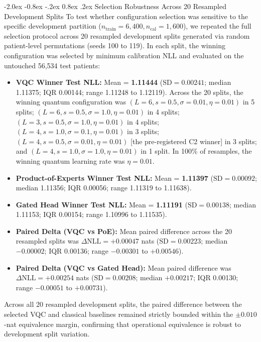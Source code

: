 \documentclass[10pt,a4paper]{article}
\makeatletter
\renewcommand{\subsection}{\@startsection{subsection}{2}{\z@}%
  {-2.0ex \@plus -0.8ex \@minus -.2ex}%
  {0.8ex \@plus.2ex}%
  {\normalfont\large\sffamily\bfseries\color{naturedark}}}
\makeatother
\begin{document}
\subsection{Selection Robustness Across 20 Resampled Development Splits}
To test whether configuration selection was sensitive to the specific development partition ($n_{\text{train}}=6,400, n_{\text{cal}}=1,600$), we repeated the full selection protocol across 20 resampled development splits generated via random patient-level permutations (seeds 100 to 119). In each split, the winning configuration was selected by minimum calibration NLL and evaluated on the untouched 56,534 test patients:
\begin{itemize}
  \item \textbf{VQC Winner Test NLL:} Mean = \textbf{1.11444} ($\text{SD} = 0.00241$; median 1.11375; IQR 0.00144; range 1.11248 to 1.12119). Across the 20 splits, the winning quantum configuration was $(L=6, s=0.5, \sigma=0.01, \eta=0.01)$ in 5 splits; $(L=6, s=0.5, \sigma=1.0, \eta=0.01)$ in 4 splits; $(L=3, s=0.5, \sigma=1.0, \eta=0.01)$ in 4 splits; $(L=4, s=1.0, \sigma=0.1, \eta=0.01)$ in 3 splits; $(L=4, s=0.5, \sigma=0.01, \eta=0.01)$ [the pre-registered C2 winner] in 3 splits; and $(L=4, s=1.0, \sigma=1.0, \eta=0.01)$ in 1 split. In 100\% of resamples, the winning quantum learning rate was $\eta=0.01$.
  \item \textbf{Product-of-Experts Winner Test NLL:} Mean = \textbf{1.11397} ($\text{SD} = 0.00092$; median 1.11356; IQR 0.00056; range 1.11319 to 1.11638).
  \item \textbf{Gated Head Winner Test NLL:} Mean = \textbf{1.11191} ($\text{SD} = 0.00138$; median 1.11153; IQR 0.00154; range 1.10996 to 1.11535).
  \item \textbf{Paired Delta (VQC vs PoE):} Mean paired difference across the 20 resampled splits was $\Delta\text{NLL} = \mathbf{+0.00047}$ nats ($\text{SD} = 0.00223$; median $-0.00002$; IQR 0.00136; range $-0.00301$ to $+0.00546$).
  \item \textbf{Paired Delta (VQC vs Gated Head):} Mean paired difference was $\Delta\text{NLL} = \mathbf{+0.00254}$ nats ($\text{SD} = 0.00208$; median $+0.00217$; IQR 0.00130; range $-0.00051$ to $+0.00731$).
\end{itemize}
Across all 20 resampled development splits, the paired difference between the selected VQC and classical baselines remained strictly bounded within the $\pm 0.010$-nat equivalence margin, confirming that operational equivalence is robust to development split variation.
\end{document}
